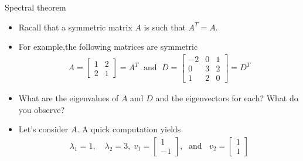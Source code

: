 \begin{frame}{Spectral theorem}
\begin{itemize}
    \item Racall that a symmetric matrix $A$ is such that $A^T=A$.
    \item For example,the following matrices are symmetric
    \begin{align}
     A = \begin{bmatrix}
         1 & 2 \\
         2 & 1
     \end{bmatrix}=A^T \;\text{ and }\; D = \begin{bmatrix}
         -2 & 0 & 1  \\
         0 & 3  & 2\\
         1 & 2 & 0
     \end{bmatrix}=D^T
 \end{align}
 \item What are the eigenvalues of $A$ and $D$ and the eigenvectors for each? What do you observe?
 \item  Let's consider $A$. A quick computation yields
 \begin{align}
     \lambda_1 = 1,\quad \lambda_2 = 3, \;v_1 = \begin{bmatrix} 1 \\ -1 \end{bmatrix}, \; \text{ and }\;\;v_2 = \begin{bmatrix} 1 \\ 1 \end{bmatrix}
 \end{align}
\end{itemize}    
\end{frame}


